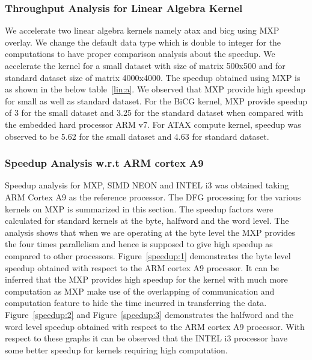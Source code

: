 




\subsubsection{Throughput Analysis for Linear Algebra Kernel}

We accelerate two linear algebra kernels namely atax and bicg using MXP overlay. We change the default data type which is double to integer for the computations to have proper comparison analysis about the speedup. We accelerate the kernel for a small dataset with size of matrix 500x500 and for standard dataset size of matrix 4000x4000. The speedup obtained using MXP is as shown in the below table~\ref{lin:a}. We observed that MXP provide high speedup for small as well as standard dataset. For the BiCG kernel, MXP provide speedup of 3 for the small dataset and 3.25 for the standard dataset when compared with the embedded hard processor ARM v7. For ATAX compute kernel, speedup was observed to be 5.62 for the small dataset and 4.63 for standard dataset.



    
    
    \subsubsection{Speedup Analysis w.r.t ARM cortex A9}
    Speedup analysis for MXP, SIMD NEON and INTEL i3 was obtained taking ARM Cortex A9 as the reference processor. The DFG processing for the various kernels on MXP is summarized in this section. The speedup factors were calculated for standard kernels at the byte, halfword and the word level. The analysis shows that when we are operating at the byte level the MXP provides the four times parallelism and hence is supposed to give high speedup as compared to other processors. Figure~\ref{speedup:1} demonstrates the byte level speedup obtained with respect to the ARM cortex A9 processor. It can be inferred that the MXP provides high speedup for the kernel with much more computation as MXP make use of the overlapping of communication and computation feature to hide the time incurred in transferring the data. Figure~\ref{speedup:2} and Figure~\ref{speedup:3} demonstrates the halfword and the word level speedup obtained with respect to the ARM cortex A9 processor. With respect to these graphs it can be observed that the INTEL i3 processor have some better speedup for kernels requiring high computation.
  
